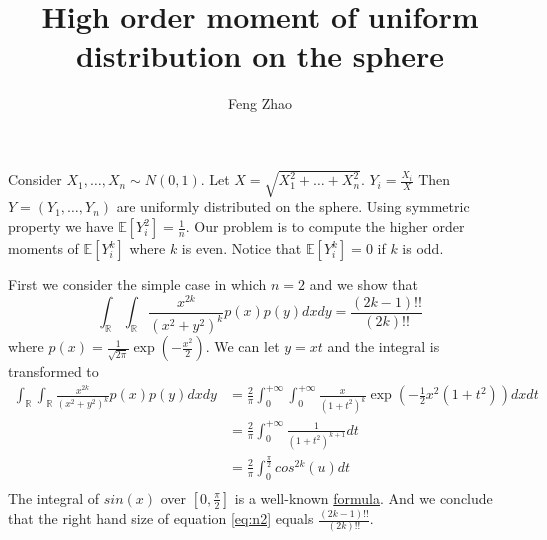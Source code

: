\documentclass{article}
\title{High order moment of uniform distribution on the sphere}
\author{Feng Zhao}
\def\E{\mathbb{E}}
\def\R{\mathbb{R}}
\begin{document}
\maketitle
Consider $X_1, \dots, X_n \sim N(0, 1)$. Let $X = \sqrt{X_1^2 + \dots + X_n^2}$.
$Y_i = \frac{X_i}{X}$ Then $Y=(Y_1, \dots, Y_n)$ are uniformly distributed on the sphere.
Using symmetric property we have $\E[Y_i^2] = \frac{1}{n}$. Our problem is to compute the higher order moments of $\E[Y_i^k]$ where $k$ is even. Notice that $\E[Y_i^k]=0$ if $k$ is odd.

First we consider the simple case in which $n=2$ and we show that
\begin{equation}\label{eq:n2}
\int_{\R}\int_{\R} \frac{x^{2k}}{(x^2+y^2)^k} p(x)p(y)dxdy = \frac{(2k-1)!!}{(2k)!!}
\end{equation}
where $p(x) = \frac{1}{\sqrt{2\pi}} \exp(-\frac{x^2}{2})$.
We can let $y=xt$ and the integral is transformed to
\begin{align*}
\int_{\R}\int_{\R} \frac{x^{2k}}{(x^2+y^2)^k} p(x)p(y)dxdy & =
\frac{2}{\pi}\int_{0}^{+\infty}\int_{0}^{+\infty} \frac{x}{(1+t^2)^k} \exp(-\frac{1}{2}x^2(1+t^2))dxdt \\
&=
\frac{2}{\pi}\int_{0}^{+\infty} \frac{1}{(1+t^2)^{k+1}}dt \\
&= \frac{2}{\pi}\int_{0}^{\frac{\pi}{2}} cos^{2k}(u)dt \\
\end{align*}
The integral of $sin(x)$ over $[0, \frac{\pi}{2}]$ is a well-known \href{https://math.stackexchange.com/questions/50447/integration-of-powers-of-the-sin-x}{formula}. And we conclude that the right hand size of equation \eqref{eq:n2} equals
$\frac{(2k-1)!!}{(2k)!!}$.
\end{document}
